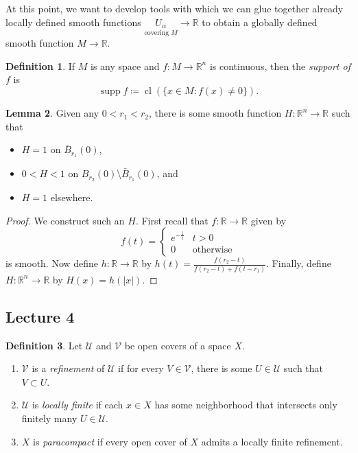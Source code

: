 \documentclass[10pt,letterpaper,cm]{nupset}
\theoremstyle{definition}
\newtheorem{definition}{Definition}[subsection]
\theoremstyle{theorem}
\newtheorem{lemma}[definition]{Lemma}
\theoremstyle{remark}
\newcommand{\R}{\mathbb R}
\newcommand{\1}{\mathbf{1}}
\newcommand{\0}{\vec 0}
\DeclareMathOperator{\supp}{supp}
\DeclareMathOperator{\cl}{cl}
\begin{document}
 \bigskip
 
 At this point, we want to develop tools with which we can glue together already locally defined smooth functions $\underset{\text{covering } M}{U_{\alpha}} \to \R$ to obtain a globally defined smooth function $M\to \R$.
 
\begin{definition}
If $M$ is any space and $f:M \to \R^n$ is continuous, then the \textit{support of $f$} is $$\supp f \coloneqq  \cl\left(\{x \in M: f(x) \ne 0\}\right).$$
\end{definition}

\begin{lemma}\label{l5}
Given any $0<r_1<r_2$, there is some smooth function $H: \R^n \to \R$ such that 
\begin{itemize}
\item $H =1$ on $\bar{B}_{r_1}(0)$, 
\item $0<H <1$ on $B_{r_2}(0)\setminus \bar{B}_{r_1}(0)$, and
\item $H=1$ elsewhere. 
\end{itemize}
\end{lemma}
\begin{proof}
We construct such an $H$. First recall that $f: \R \to \R$ given by 
\[
f(t) = \begin{cases}
e^{-\frac{1}{t}} & t>0
\\ 0 & \text{otherwise}
\end{cases}
\] is smooth. Now define $h: \R \to \R$ by $h(t) = \frac{f(r_2-t)}{f(r_2-t)+ f(t-r_1)}$. Finally, define $H: \R^n \to \R$ by $H(x) = h(\left\lvert{x}\right\rvert)$.
\end{proof}

\subsection{Lecture 4}



\begin{definition}
Let $\mathcal{U}$ and $\mathcal{V}$ be open covers of a space $X$.
\begin{enumerate}
\item  $\mathcal{V}$ is a \textit{refinement} of $\mathcal{U}$ if for every $V\in \mathcal{V}$, there is some $U \in \mathcal{U}$ such that $V \subset U$.
\item $\mathcal{U}$ is \textit{locally finite} if each $x\in X$ has some neighborhood that intersects only finitely many $U \in \mathcal{U}$. 
\item $X$ is \textit{paracompact} if every open cover of $X$ admits a locally finite refinement.
\end{enumerate}
\end{definition}
\end{document}
